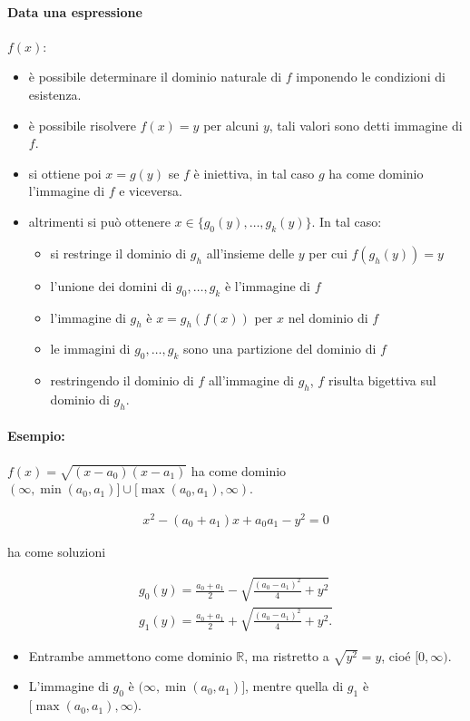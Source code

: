 \documentclass{article}
\begin{document}
\paragraph{Data una espressione} $f(x)$:

\begin{itemize}
\item è possibile determinare il dominio naturale di $f$ imponendo le condizioni di esistenza.
\item è possibile risolvere $f(x) = y$ per alcuni $y$, tali valori sono detti immagine di $f$.
\item si ottiene poi $x = g(y)$ se $f$ è iniettiva, in tal caso $g$ ha come dominio l'immagine di $f$ e viceversa.
\item altrimenti si può ottenere $x \in \{g_0(y), \dots, g_k(y)\}$. In tal caso:
\begin{itemize}
\item si restringe il dominio di $g_h$ all'insieme delle $y$ per cui $f (g_h (y)) = y$
\item l'unione dei domini di $g_0, \dots, g_k$ è l'immagine di $f$
\item l'immagine di $g_h$ è $x = g_h (f (x))$ per $x$ nel dominio di $f$
\item le immagini di $g_0, \dots, g_k$ sono una partizione del dominio di $f$
\item restringendo il dominio di $f$ all'immagine di $g_h$, $f$ risulta bigettiva sul dominio di $g_h$.
\end{itemize}
\end{itemize}

\paragraph{Esempio:} $f(x) = \sqrt{(x - a_0)(x - a_1)}$ ha come dominio $(\infty, \min(a_0, a_1)] \cup [\max(a_0, a_1), \infty)$.

\begin{align*}
x^2 - (a_0 + a_1) x + a_0 a_1 - y^2 = 0
\end{align*}

ha come soluzioni

\begin{align*}
g_0(y) = \frac{a_0 + a_1}{2} - \sqrt{\frac{(a_0 - a_1)^2}{4} + y^2}\\
g_1(y) = \frac{a_0 + a_1}{2} + \sqrt{\frac{(a_0 - a_1)^2}{4} + y^2.}
\end{align*}

\begin{itemize}
\item Entrambe ammettono come dominio $\mathbb R$, ma ristretto a $\sqrt{y^2} = y$, cioé $[0, \infty)$.
\item L'immagine di $g_0$ è $(\infty, \min(a_0, a_1)]$, mentre quella di $g_1$ è $[\max(a_0, a_1), \infty)$.
\end{itemize}
\end{document}
